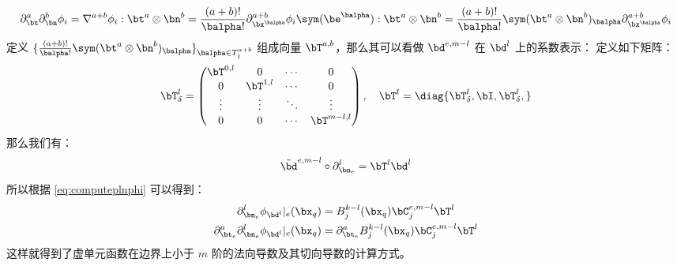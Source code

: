 $$
\partial_{\bt}^a \partial_{\bn}^b \phi_i = \nabla^{a+b} \phi_i : \bt^a\otimes\bn^b
= \frac{(a+b)!}{\balpha!}\partial_{\bx^{\balpha}}^{a+b}\phi_i 
\sym(\be^{\balpha}): \bt^a\otimes\bn^b
= \frac{(a+b)!}{\balpha!}\sym(\bt^a\otimes\bn^b)_{\balpha}
\partial_{\bx^{\balpha}}^{a+b}\phi_i 
$$
定义 $\{\frac{(a+b)!}{\balpha!}\sym(\bt^a\otimes\bn^b)_{\balpha}\}_{\balpha \in
T_1^{a+b}}$ 
组成向量 $\bT^{a, b}$，那么其可以看做 $\bd^{e,
m-l}$ 在 $\bd^l$ 上的系数表示：
定义如下矩阵：
$$
\bT^{l}_{\delta} = 
\begin{pmatrix}
    \bT^{0, l} & 0 & \cdots & 0\\
    0 & \bT^{1, l} & \cdots & 0\\
    \vdots & \vdots & \ddots & \vdots\\
    0 & 0 & \cdots & \bT^{m-l, l} 
\end{pmatrix}
,\quad
\bT^{l} = \diag\{\bT^{l}_{\delta},  \bI, \bT^{l}_{\delta},\}
$$
那么我们有：
$$
\tilde{\bd}^{e, m-l}\circ \partial_{\bn_e}^l = \bT^{l}\bd^{l}
$$
所以根据 \eqref{eq:computeplnphi} 可以得到：
\begin{equation}
\label{eq:computepltplnphi}
\begin{aligned}
\partial_{\bn_e}^l\phi_{\bd^l}|_e(\bx_q) & = B_j^{k-l}(\bx_q)\bC_{j}^{e, m-l}
\bT^l\\
\partial_{\bt_e}^a\partial_{\bn_e}^l\phi_{\bd^l}|_e(\bx_q) & =
\partial_{\bt_e}^aB_j^{k-l}(\bx_q)\bC_{j}^{e, m-l}\bT^l
\end{aligned}
\end{equation}
这样就得到了虚单元函数在边界上小于 $m$ 阶的法向导数及其切向导数的计算方式。
